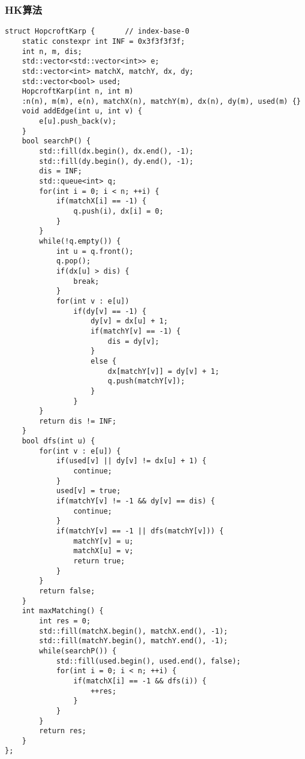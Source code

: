 \subsubsection{HK算法}
\begin{lstlisting}
struct HopcroftKarp {		// index-base-0
    static constexpr int INF = 0x3f3f3f3f;
    int n, m, dis;
    std::vector<std::vector<int>> e;
    std::vector<int> matchX, matchY, dx, dy;
    std::vector<bool> used;
    HopcroftKarp(int n, int m)
    :n(n), m(m), e(n), matchX(n), matchY(m), dx(n), dy(m), used(m) {}
    void addEdge(int u, int v) {
        e[u].push_back(v);
    }
    bool searchP() {
        std::fill(dx.begin(), dx.end(), -1);
        std::fill(dy.begin(), dy.end(), -1);
        dis = INF;
        std::queue<int> q;
        for(int i = 0; i < n; ++i) {
            if(matchX[i] == -1) {
                q.push(i), dx[i] = 0;
            }
        }
        while(!q.empty()) {
            int u = q.front(); 
            q.pop();
            if(dx[u] > dis) {
				break;
			}
            for(int v : e[u])
                if(dy[v] == -1) {
                    dy[v] = dx[u] + 1;
                    if(matchY[v] == -1) {
						dis = dy[v];
					}
                    else {
						dx[matchY[v]] = dy[v] + 1;
						q.push(matchY[v]);
					}
                }
        }
        return dis != INF;
    }
    bool dfs(int u) {
        for(int v : e[u]) {
            if(used[v] || dy[v] != dx[u] + 1) {
				continue;
			}
            used[v] = true;
            if(matchY[v] != -1 && dy[v] == dis) {
				continue;
			}
            if(matchY[v] == -1 || dfs(matchY[v])) {
                matchY[v] = u;
                matchX[u] = v;
                return true;
            }
        }
        return false;
    }
    int maxMatching() {
        int res = 0;
        std::fill(matchX.begin(), matchX.end(), -1);
        std::fill(matchY.begin(), matchY.end(), -1);
        while(searchP()) {
            std::fill(used.begin(), used.end(), false);
            for(int i = 0; i < n; ++i) {
				if(matchX[i] == -1 && dfs(i)) {
					++res;
				}
			}
        }
        return res;
    }
};
\end{lstlisting}


